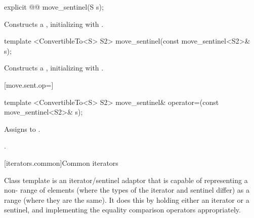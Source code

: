 %
\begin{itemdecl}
explicit @@ move_sentinel(S s);
\end{itemdecl}

\begin{itemdescr}
\pnum
\effects Constructs a , initializing
 with .
\end{itemdescr}

%
\begin{itemdecl}
template <ConvertibleTo<S> S2>
  move_sentinel(const move_sentinel<S2>& s);
\end{itemdecl}

\begin{itemdescr}
\pnum
\effects Constructs a , initializing
 with .
\end{itemdescr}

[move.sent.op=]{}

%
%
\begin{itemdecl}
template <ConvertibleTo<S> S2>
  move_sentinel& operator=(const move_sentinel<S2>& s);
\end{itemdecl}

\begin{itemdescr}
\pnum
\effects Assigns  to .

\pnum
\returns {}.
\end{itemdescr}



[iterators.common]{Common iterators}


\pnum
Class template  is an iterator/sentinel adaptor that is
capable of representing a non- range of elements (where the types of the
iterator and sentinel differ) as a  range (where they are the same). It
does this by holding either an iterator or a sentinel, and implementing the
equality comparison operators appropriately.


